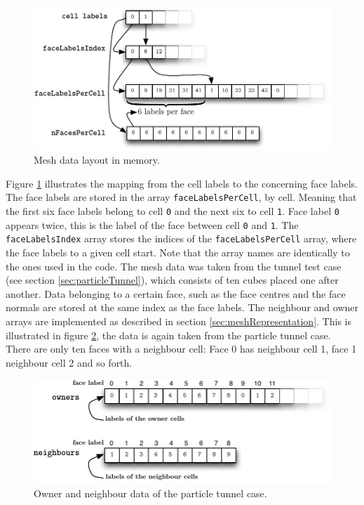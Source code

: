 \begin{figure}[H]
  \centering
  \includegraphics[scale=0.8]{content/gfx/cellFacesMapping.pdf}
  \caption{Mesh data layout in memory.}
  \label{gfx:cellFacesMapping}
\end{figure}

Figure \ref{gfx:cellFacesMapping} illustrates the mapping from the cell labels to the concerning face labels. The face labels are stored in the array \verb+faceLabelsPerCell+, by cell. Meaning that the first six face labels belong to cell \verb+0+ and the next six to cell \verb+1+. Face label \verb+0+ appears twice, this is the label of the face between cell \verb+0+ and \verb+1+. The \verb+faceLabelsIndex+ array stores the indices of the \verb+faceLabelsPerCell+ array, where the face labels to a given cell start. Note that the array names are identically to the ones used in the code. The mesh data was taken from the tunnel test case (see section \ref{sec:particleTunnel}), which consists of ten cubes placed one after another. Data belonging to a certain face, such as the face centres and the face normals are stored at the same index as the face labels. The neighbour and owner arrays are implemented as described in section \ref{sec:meshRepresentation}. This is illustrated in figure \ref{gfx:ownerNeighbour}, the data is again taken from the particle tunnel case. There are only ten faces with a neighbour cell: Face 0 has neighbour cell 1, face 1 neighbour cell 2 and so forth. 

\begin{figure}[H]
  \centering
  \includegraphics[scale=0.8]{content/gfx/ownerNeighbour.pdf}
  \caption{Owner and neighbour data of the particle tunnel case.}
  \label{gfx:ownerNeighbour}
\end{figure}

